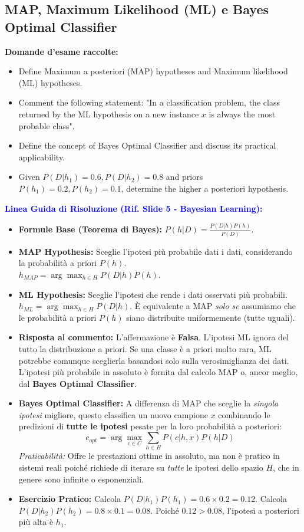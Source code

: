 \documentclass[11pt,a4paper]{article}
\begin{document}
\subsection{MAP, Maximum Likelihood (ML) e Bayes Optimal Classifier}
\textbf{Domande d'esame raccolte:}
\begin{itemize}
    \item Define Maximum a posteriori (MAP) hypotheses and Maximum likelihood (ML) hypotheses.
    \item Comment the following statement: "In a classification problem, the class returned by the ML hypothesis on a new instance $x$ is always the most probable class".
    \item Define the concept of Bayes Optimal Classifier and discuss its practical applicability.
    \item Given $P(D|h_1)=0.6, P(D|h_2)=0.8$ and priors $P(h_1)=0.2, P(h_2)=0.1$, determine the higher a posteriori hypothesis.
\end{itemize}

\textbf{\textcolor{blue}{Linea Guida di Risoluzione (Rif. Slide 5 - Bayesian Learning):}}
\begin{itemize}
    \item \textbf{Formule Base (Teorema di Bayes):} $P(h|D) = \frac{P(D|h)P(h)}{P(D)}$.
    \item \textbf{MAP Hypothesis:} Sceglie l'ipotesi più probabile dati i dati, considerando la probabilità a priori $P(h)$. \\ $h_{MAP} = \arg\max_{h \in H} P(D|h)P(h)$.
    \item \textbf{ML Hypothesis:} Sceglie l'ipotesi che rende i dati osservati più probabili. \\ $h_{ML} = \arg\max_{h \in H} P(D|h)$. È equivalente a MAP \textit{solo se} assumiamo che le probabilità a priori $P(h)$ siano distribuite uniformemente (tutte uguali).
    \item \textbf{Risposta al commento:} L'affermazione è \textbf{Falsa}. L'ipotesi ML ignora del tutto la distribuzione a priori. Se una classe è a priori molto rara, ML potrebbe comunque sceglierla basandosi solo sulla verosimiglianza dei dati. L'ipotesi più probabile in assoluto è fornita dal calcolo MAP o, ancor meglio, dal \textbf{Bayes Optimal Classifier}.
    \item \textbf{Bayes Optimal Classifier:} A differenza di MAP che sceglie la \textit{singola ipotesi} migliore, questo classifica un nuovo campione $x$ combinando le predizioni di \textbf{tutte le ipotesi} pesate per la loro probabilità a posteriori:
    $$ c_{opt} = \arg\max_{c \in C} \sum_{h \in H} P(c|h, x) P(h|D) $$
    \textit{Praticabilità:} Offre le prestazioni ottime in assoluto, ma non è pratico in sistemi reali poiché richiede di iterare su \textit{tutte} le ipotesi dello spazio $H$, che in genere sono infinite o esponenziali.
    \item \textbf{Esercizio Pratico:} Calcola $P(D|h_1)P(h_1) = 0.6 \times 0.2 = 0.12$. Calcola $P(D|h_2)P(h_2) = 0.8 \times 0.1 = 0.08$. Poiché $0.12 > 0.08$, l'ipotesi a posteriori più alta è $h_1$.
\end{itemize}
\end{document}
